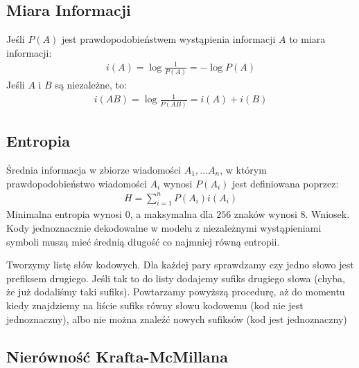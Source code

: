 \documentclass{article}
\numberwithin{equation}{subsection}
\newenvironment{definition}[1]{%
    \trivlist
    \item[\hskip\labelsep\textbf{Definition. #1.}]
    \ignorespaces
}{%
    \endtrivlist
}
\newenvironment{fact}[1]{%
    \trivlist
    \item[\hskip\labelsep\textbf{Fact. #1.}]
    \ignorespaces
}{%
    \endtrivlist
}
\begin{document}
\subsection{Miara Informacji}

\begin{definition}{Teoria Informacji}
    Jeśli $P(A)$ jest prawdopodobieństwem wystąpienia informacji $A$ to miara informacji:
    \begin{align*}
        i(A) = \log \frac{1}{P(A)} = -\log P(A)
    \end{align*}
    Jeśli $A$ i $B$ są niezależne, to:
    \begin{align*}
        i(AB) = \log \frac{1}{P(AB)} = i(A) + i(B)
    \end{align*}
\end{definition}

\subsection{Entropia}

\begin{definition}{Entropia}
    Średnia informacja w zbiorze wiadomości $A_1,\dots A_n$, w którym prawdopodobieństwo wiadomości $A_i$ wynosi $P(A_i)$ jest definiowana poprzez:
    \begin{align*}
        H = \sum_{i=1}^{n} P(A_i) i(A_i)
    \end{align*}
    Minimalna entropia wynosi $0$, a maksymalna dla $256$ znaków wynosi $8$.
    Wniosek. Kody jednoznacznie dekodowalne w modelu z niezależnymi wystąpieniami symboli muszą mieć średnią długość co najmniej równą entropii.
\end{definition}

\begin{fact}{Test na jednoznaczną dekodowalność}
    Tworzymy listę słów kodowych. Dla każdej pary sprawdzamy
    czy jedno słowo jest prefiksem drugiego. Jeśli tak to do listy dodajemy sufiks drugiego słowa (chyba,
    że już dodaliśmy taki sufiks). Powtarzamy powyższą procedurę, aż do momentu kiedy znajdziemy
    na liście sufiks równy słowu kodowemu (kod nie jest jednoznaczny),
    albo nie można znaleźć nowych sufiksów (kod jest jednoznaczny)
\end{fact}

\subsection{Nierówność Krafta-McMillana}
\end{document}
